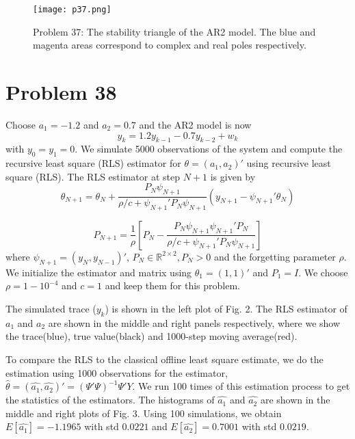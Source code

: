 \documentclass[a4paper, 11pt]{article}
\begin{document}
\begin{figure}
	\begin{center}
		\texttt{[image: p37.png]}
		\caption{Problem 37: The stability triangle of the AR2 model. The blue and magenta areas correspond to complex and real poles respectively.}
	\end{center}
\end{figure}



\section*{Problem 38}

Choose $a_1 = -1.2$ and $a_2=0.7$ and the AR2 model is now
\begin{equation}
y_k = 1.2y_{k-1} - 0.7y_{k-2} + w_k
\end{equation}
with $y_0 = y_1 = 0$. We simulate 5000 observations of the system and compute the recursive least square (RLS) estimator for $\theta = (a_1, a_2)'$ using recursive least square (RLS). The RLS estimator at step $N+1$ is given by  
\begin{equation}
\theta_{N+1} = \theta_N + \frac{P_N\psi_{N+1}}{\rho/c + \psi_{N+1}'P_N\psi_{N+1}}(y_{N+1} - \psi_{N+1}'\theta_N)
\end{equation}

\begin{equation}
P_{N+1} = \frac{1}{\rho}\left[P_N - \frac{P_N\psi_{N+1}\psi_{N+1}'P_N}{\rho/c + \psi_{N+1}'P_N\psi_{N+1}} \right]
\end{equation}
where $\psi_{N+1} = (y_N, y_{N-1})'$, $P_N \in \mathbb{R}^{2\times 2}, P_N >0$ and the forgetting parameter $\rho$. We initialize the estimator and matrix using $\theta_1 = (1, 1)'$ and $P_1 = I$. We choose $\rho = 1-10^{-4}$ and $c=1$ and keep them for this problem. 


The simulated trace ($y_k$) is shown in the left plot of Fig. 2. The RLS estimator of $a_1$ and $a_2$ are shown in the middle and right panels respectively, where we show the trace(blue), true value(black) and 1000-step moving average(red). 


To compare the RLS to the classical offline least square estimate, we do the estimation using 1000 observations for the estimator, $\hat{\theta} = (\hat{a_1}, \hat{a_2})' = (\Psi' \Psi)^{-1} \Psi' Y$. We run 100 times of this estimation process to get the statistics of the estimators. The histograms of $\hat{a_1}$ and $\hat{a_2}$ are shown in the middle and right plots of Fig. 3. Using 100 simulations, we obtain $E[\hat{a_1}] = -1.1965$ with std $0.0221$ and $E[\hat{a_2}] = 0.7001$ with std $0.0219$. 
\end{document}

